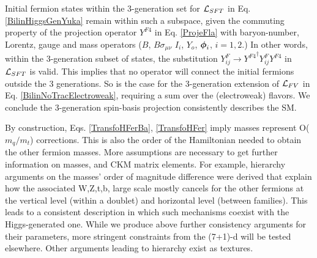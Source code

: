 \documentclass[12pt]{article}
\renewcommand\[{\begin{dmath}}
\renewcommand\]{\end{dmath}}
\newcommand{\boldmathphi}{\mbox{\boldmath$\phi$\unboldmath}}
\begin{document}
 Initial fermion states within the 3-generation  set  for ${\cal L}_{SFT} $ in Eq.    \ref{BilinHiggsGenYuka}    remain  within such a subspace, given
the commuting property of the projection operator $Y^{F4}$ in Eq. \ref{ProjeFla} with  baryon-number, Lorentz,  gauge   and mass operators ($B$, $B \sigma_{\mu\nu}$  $I_i$, $Y_{o}$, $\boldmathphi_{i}$, $i= 1,2$.)   In other words, within the 3-generation subset of states,    the substitution  $Y^{ F}_{ij}\rightarrow {Y^{ F4}}^\dagger Y^{ F}_{ij} {Y^{F4}}$ in ${\cal L}_{SFT} $  is valid.
This implies that no operator will  connect the initial fermions outside the 3 generations. So is the case for the 3-generation extension of ${\cal L}_{FV} $ in Eq. \ref {BilinNoTracElectroweak},  requiring a  sum over the (electroweak) flavors.
We conclude the 3-generation
  spin-basis projection   consistently describes the SM.


 By
construction,  Eqs. \ref{TransfoHFerBa},  \ref{TransfoHFer} imply masses represent O($m_q/m_t$) corrections. This is also the order of the  Hamiltonian needed to obtain the other fermion masses.
 More assumptions are necessary to get further information on masses, and CKM matrix elements. For example,  hierarchy  arguments on the masses'  order of magnitude difference   were derived\cite{Romero}    that  explain how the associated W,Z,t,b, large scale  mostly cancels for the other fermions  at the vertical level (within a  doublet) and horizontal level (between families).
This leads to a consistent description    in which such    mechanisms  coexist  with the Higgs-generated one.
While we produce above further consistency arguments for their parameters, more stringent constraints from the (7+1)-d will be tested elsewhere. Other arguments leading to hierarchy exist as textures\cite{fermionMassReview}.
\end{document}
